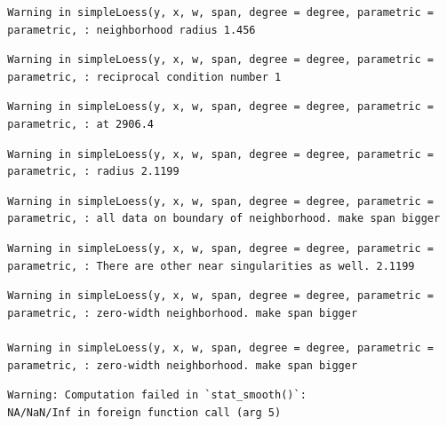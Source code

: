 \documentclass[12pt,twoside]{reedthesis}
\begin{document}
  \begin{verbatim}
  Warning in simpleLoess(y, x, w, span, degree = degree, parametric =
  parametric, : neighborhood radius 1.456
  \end{verbatim}
  
  \begin{verbatim}
  Warning in simpleLoess(y, x, w, span, degree = degree, parametric =
  parametric, : reciprocal condition number 1
  \end{verbatim}
  
  \begin{verbatim}
  Warning in simpleLoess(y, x, w, span, degree = degree, parametric =
  parametric, : at 2906.4
  \end{verbatim}
  
  \begin{verbatim}
  Warning in simpleLoess(y, x, w, span, degree = degree, parametric =
  parametric, : radius 2.1199
  \end{verbatim}
  
  \begin{verbatim}
  Warning in simpleLoess(y, x, w, span, degree = degree, parametric =
  parametric, : all data on boundary of neighborhood. make span bigger
  \end{verbatim}
  
  \begin{verbatim}
  Warning in simpleLoess(y, x, w, span, degree = degree, parametric =
  parametric, : There are other near singularities as well. 2.1199
  \end{verbatim}
  
  \begin{verbatim}
  Warning in simpleLoess(y, x, w, span, degree = degree, parametric =
  parametric, : zero-width neighborhood. make span bigger
  
  Warning in simpleLoess(y, x, w, span, degree = degree, parametric =
  parametric, : zero-width neighborhood. make span bigger
  \end{verbatim}
  
  \begin{verbatim}
  Warning: Computation failed in `stat_smooth()`:
  NA/NaN/Inf in foreign function call (arg 5)
  \end{verbatim}
  
\end{document}
